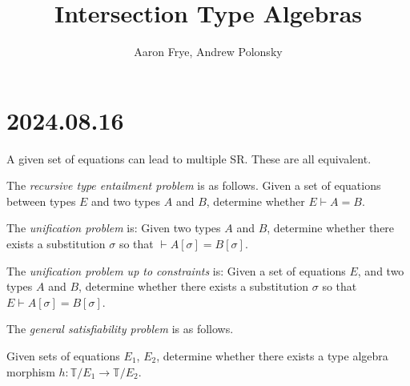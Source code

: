 \documentclass{scrartcl}
\title{Intersection Type Algebras}
\author{Aaron Frye, Andrew Polonsky}
\newcommand{\types}{\mathbb{T}}
\begin{document}
\section{2024.08.16}

A given set of equations can lead to multiple SR.  These are all equivalent.

The \emph{recursive type entailment problem} is as follows.
Given a set of equations between types $E$ and two types $A$ and $B$,
determine whether $E \vdash A = B$.

The \emph{unification problem} is: Given two types $A$ and $B$,
determine whether there exists a substitution $\sigma$
so that $\vdash A[\sigma] = B[\sigma]$.

The \emph{unification problem up to constraints} is: Given a set of equations $E$,
and two types $A$ and $B$, determine whether there exists a substitution $\sigma$
so that $E \vdash A[\sigma] = B[\sigma]$.


The \emph{general satisfiability problem} is as follows.

Given sets of equations $E_1$, $E_2$, determine whether there exists
a type algebra morphism $h : \types/E_1 \to \types/E_2$.
\end{document}
